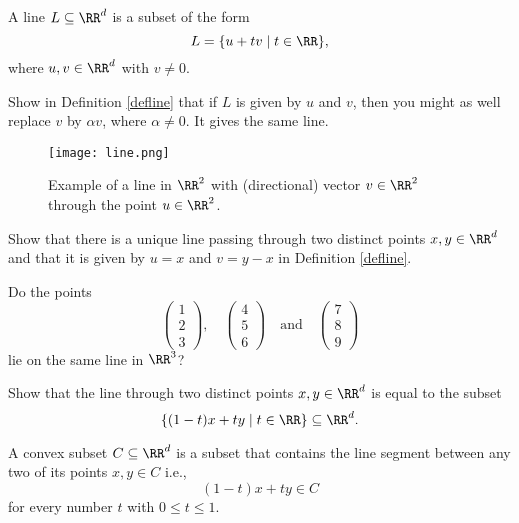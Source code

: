 \documentclass{article}
\begin{document}
    \begin{definition}[emph]\label{defline}
      A line $L\subseteq \RR^d$ is a subset of the form
      $$
      L = \{u + t v \mid t\in \RR\},
      $$
      where $u, v\in \RR^d$ with $v\neq 0$.
    \end{definition}

    \beginshex
    Show in Definition \ref{defline} that if $L$ is given by $u$ and $v$, then
    you might as well replace $v$ by $\alpha v$, where $\alpha\neq 0$.  It gives
    the same line.
    \endshex
    
\begin{figure}
  \texttt{[image: line.png]}
  \begin{center}
    Example of a line in $\RR^2$ with (directional) vector $v\in \RR^2$ through the point $u\in \RR^2$.
  \end{center}
\end{figure}


\begin{exercise}[emph]
  Show that there is a unique line passing through two distinct points
    $x, y\in \RR^d$ and that it is given by $u = x$ and $v = y - x$ in Definition \ref{defline}.
\end{exercise}

    \beginshex
    Do the points
    $$
    \begin{pmatrix}1\\ 2\\ 3\end{pmatrix}, \quad \begin{pmatrix} 4\\ 5\\ 6\end{pmatrix}
    \quad\text{and}\quad \begin{pmatrix} 7\\ 8\\ 9\end{pmatrix}
    $$
    lie on the same line in $\RR^3$?
    \endshex
    
    \beginshex
    Show that the line through two distinct points $x, y\in \RR^d$ is equal to the subset
    $$
    \{ (1-t) x + t y \mid t\in \RR\} \subseteq \RR^d.
    $$
    \endshex
    

    \begin{definition}[emph]
    A convex subset $C\subseteq \RR^d$ is a subset that contains the
    line segment between any two of its points $x, y\in C$ i.e.,
    $$
    (1 - t) x + t y\in C
    $$
    for every number $t$ with $0\leq t \leq 1$.
    \end{definition}
\end{document}
